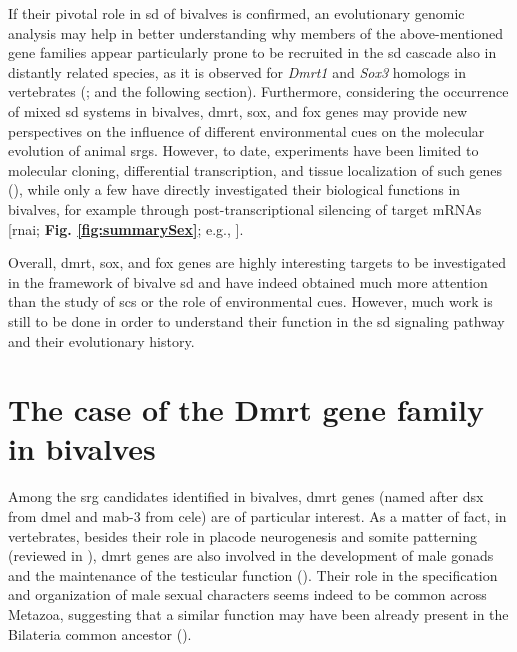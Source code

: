 If their pivotal role in \gls{sd} of bivalves is confirmed, an evolutionary genomic analysis may help in better understanding why members of the above-mentioned gene families appear particularly prone to be recruited in the \gls{sd} cascade also in distantly related species, as it is observed for \textit{Dmrt1} and \textit{Sox3} homologs in vertebrates (\textbf{\cite{marshall2010homologies,bachtrog2014sex}}; and the following section). Furthermore, considering the occurrence of mixed \gls{sd} systems in bivalves, \gls{dmrt}, \gls{sox}, and \gls{fox} genes may provide new perspectives on the influence of different environmental cues on the molecular evolution of animal \glspl{srg}. However, to date, experiments have been limited to molecular cloning, differential transcription, and tissue localization of such genes (\textbf{\cite{liang2019sox2,sun2022examination}}), while only a few have directly investigated their biological functions in bivalves, for example through post-transcriptional silencing of target mRNAs [\gls{rnai}; \textbf{Fig. \ref{fig:summarySex}}; e.g., \textbf{\cite{liang2019sox2,wang2020identification,sun2022examination}}].

Overall, \gls{dmrt}, \gls{sox}, and \gls{fox} genes are highly interesting targets to be investigated in the framework of bivalve \gls{sd} and have indeed obtained much more attention than the study of \glspl{sc} or the role of environmental cues. However, much work is still to be done in order to understand their function in the \gls{sd} signaling pathway and their evolutionary history.

\section{The case of the Dmrt gene family in bivalves}

Among the \gls{srg} candidates identified in bivalves, \gls{dmrt} genes (named after \gls{dsx} from \gls{dmel} and \gls{mab-3} from \gls{cele}) are of particular interest. As a matter of fact, in vertebrates, besides their role in placode neurogenesis and somite patterning (reviewed in \textbf{\cite{mawaribuchi2019independent}}), \gls{dmrt} genes are also involved in the development of male gonads and the maintenance of the testicular function (\textbf{\cite{sun2022examination}}). Their role in the specification and organization of male sexual characters seems indeed to be common across Metazoa, suggesting that a similar function may have been already present in the Bilateria common ancestor (\textbf{\cite{kopp2012dmrt, beukeboom2014evolution}}).

